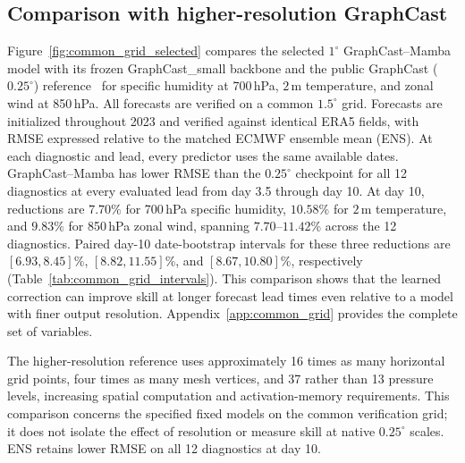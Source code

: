 \documentclass{article}
\newcommand{\suozhi}[1]{}
\renewcommand{\suozhi}[1]{}
\newcommand{\vfourchange}[1]{{\color{blue}#1}}
\begin{document}
\subsection{\texorpdfstring{{Comparison with higher-resolution GraphCast}}{Comparison with higher-resolution GraphCast}}
\label{sec:common_grid}
Figure~\ref{fig:common_grid_selected} compares the \vfourchange{selected $1^\circ$} GraphCast--Mamba model with its \vfourchange{frozen} GraphCast\vfourchange{\_small} backbone and the \vfourchange{public} GraphCast ($0.25^\circ$) reference~\citep{lam2023graphcast} for \vfourchange{specific humidity at 700\,hPa}, $2$\,m temperature, and zonal wind at 850\,hPa. All forecasts are verified on a common $1.5^\circ$ grid. \vfourchange{Forecasts are initialized throughout 2023 and verified against identical ERA5 fields, with RMSE expressed relative to the matched ECMWF ensemble mean (ENS). At each diagnostic and lead, every predictor uses the same available dates. GraphCast--Mamba has lower RMSE than the $0.25^\circ$ checkpoint for all 12 diagnostics at every evaluated lead from day 3.5 through day 10. At day 10, reductions are $7.70\%$ for 700\,hPa specific humidity, $10.58\%$ for $2$\,m temperature, and $9.83\%$ for 850\,hPa zonal wind, spanning $7.70$--$11.42\%$ across the 12 diagnostics. Paired day-10 date-bootstrap intervals for these three reductions are $[6.93,8.45]\%$, $[8.82,11.55]\%$, and $[8.67,10.80]\%$, respectively (Table~\ref{tab:common_grid_intervals}).} This comparison shows that the learned correction can improve skill at longer forecast lead times even relative to a model with finer output resolution. Appendix~\ref{app:common_grid} provides the complete set of variables.

\vfourchange{The higher-resolution reference uses approximately 16 times as many horizontal grid points, four times as many mesh vertices, and 37 rather than 13 pressure levels, increasing spatial computation and activation-memory requirements. This comparison concerns the specified fixed models on the common verification grid; it does not isolate the effect of resolution or measure skill at native $0.25^\circ$ scales. ENS retains lower RMSE on all 12 diagnostics at day 10.}
\suozhi{\color{blue}I think it is interesting that our GC-Mamba outperforms even the much larger model.}
\end{document}

